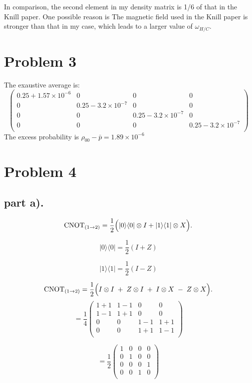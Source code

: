 \documentclass[11pt]{article}
\begin{document}
In comparison, the second element in my density matrix is 1/6 of that in the Knill paper. One possible reason is The magnetic field used in the Knill paper is stronger than that in my case, which leads to a larger value of $\omega_{H/C}$.


\section*{Problem 3}
The exaustive average is:
\[
    \begin{pmatrix}
    0.25+1.57\times10^{-6} & 0 & 0 & 0 \\
    0 & 0.25-3.2\times10^{-7} & 0 & 0 \\
    0 & 0 & 0.25-3.2\times10^{-7} & 0 \\
    0 & 0 & 0 & 0.25-3.2\times10^{-7} \\
    \end{pmatrix}
\]
The excess probability is $\rho_{00} - \bar{p} = 1.89\times10^{-6}$

\section*{Problem 4}

\subsection*{part a).}
\[
\mathrm{CNOT}_{(1\to 2)} 
= \frac{1}{2} \Bigl( |0\rangle \langle0| \otimes I + |1\rangle \langle1| \otimes X \Bigr).
\]

\[
    |0\rangle \langle0| = \frac{1}{2} (I + Z)
\]

\[
    |1\rangle \langle1| = \frac{1}{2} (I - Z)
\]

\[
\mathrm{CNOT}_{(1\to 2)} 
= \frac{1}{2} \Bigl( I \otimes I \;+\; Z \otimes I \;+\; I \otimes X \;-\; Z \otimes X \Bigr).
\]
\[
=\frac{1}{4}
    \begin{pmatrix}
    1 + 1  & 1 - 1 & 0 & 0 \\
    1 - 1 & 1 + 1  & 0 & 0 \\
    0 & 0 & 1 - 1 & 1 + 1 \\
    0 & 0 & 1 + 1 & 1 - 1 \\
    \end{pmatrix}
\]

\[
=\frac{1}{2}
    \begin{pmatrix}
    1 & 0 & 0 & 0 \\
    0 & 1 & 0 & 0 \\
    0 & 0 & 0 & 1 \\
    0 & 0 & 1 & 0 \\
    \end{pmatrix}
\]
\end{document}
